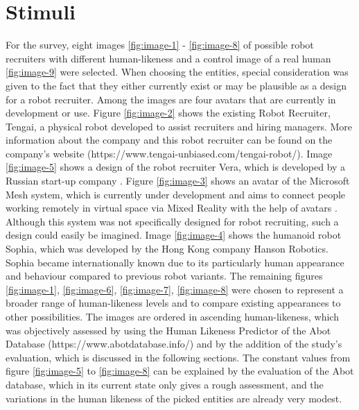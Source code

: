 \section{Stimuli}
For the survey, eight images \ref{fig:image-1} - \ref{fig:image-8} of possible robot recruiters with different human-likeness and a control image of a real human \ref{fig:image-9} were selected. When choosing the entities, special consideration was given to the fact that they either currently exist or may be plausible as a design for a robot recruiter. Among the images are four avatars that are currently in development or use. Figure \ref{fig:image-2} shows the existing Robot Recruiter, Tengai, a physical robot developed to assist recruiters and hiring managers. More information about the company and this robot recruiter can be found on the company's website (https://www.tengai-unbiased.com/tengai-robot/). Image \ref{fig:image-5} shows a design of the robot recruiter Vera, which is developed by a Russian start-up company \cite{vera}. Figure \ref{fig:image-3} shows an avatar of the Microsoft Mesh system, which is currently under development and aims to connect people working remotely in virtual space via Mixed Reality with the help of avatars \cite{microsoft_mesh}. Although this system was not specifically designed for robot recruiting, such a design could easily be imagined. Image \ref{fig:image-4} shows the humanoid robot Sophia, which was developed by the Hong Kong company Hanson Robotics. Sophia became internationally known due to its particularly human appearance and behaviour compared to previous robot variants. The remaining figures \ref{fig:image-1}, \ref{fig:image-6}, \ref{fig:image-7}, \ref{fig:image-8} were chosen to represent a broader range of human-likeness levels and to compare existing appearances to other possibilities. The images are ordered in ascending human-likeness, which was objectively assessed by using the Human Likeness Predictor of the Abot Database (https://www.abotdatabase.info/) and by the addition of the study's evaluation, which is discussed in the following sections. The constant values from figure \ref{fig:image-5} to \ref{fig:image-8} can be explained by the evaluation of the Abot database, which in its current state only gives a rough assessment, and the variations in the human likeness of the picked entities are already very modest.
\begin{table}[b!]
\centering
{}
\caption{Rated human-likeness of the figures.}
\label{tab:rated-human-likeness}
\end{table}
\newpage

